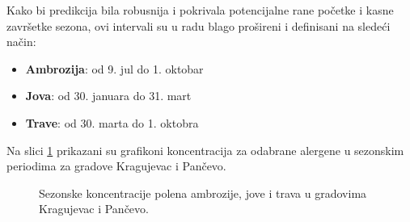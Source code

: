 \documentclass[12pt]{article}
\begin{document}
Kako bi predikcija bila robusnija i pokrivala potencijalne rane početke i kasne završetke sezona, ovi intervali su u radu blago prošireni i definisani na sledeći način:

\begin{itemize}
    \item \textbf{Ambrozija}: od 9. jul do 1. oktobar
    \item \textbf{Jova}: od 30. januara do 31. mart
    \item \textbf{Trave}: od 30. marta do 1. oktobra
\end{itemize}

Na slici \ref{fig:seasonal_concentration} prikazani su grafikoni koncentracija za odabrane alergene u sezonskim periodima za gradove Kragujevac i Pančevo. 

\begin{figure}[H]
    \centering



    \caption{Sezonske koncentracije polena ambrozije, jove i trava u gradovima Kragujevac i Pančevo.}
    \label{fig:seasonal_concentration}
\end{figure}
\end{document}
